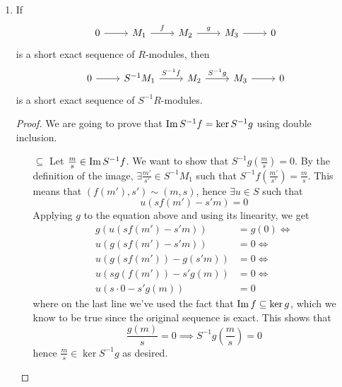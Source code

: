 \begin{exercise}
\begin{enumerate}
\begin{proof}
    For an arbitrary \(I \leq R\), we want \(S^{-1} \sqrt{I} = \sqrt{S^{-1} I}\).
    \begin{itemize}
        \item[\(\subseteq\)] Let \(\frac{a}{s} \in S^{-1} \sqrt{I}\). This means that \(a \in \sqrt{I}\), therefore \(\exists n \in \naturals\) such that \(a^n \in I\). Then \(\frac{a^n}{1} \in S^{-1} I \subseteq \sqrt{S^{-1} I}\).
    
        \item[\(\supseteq\)] Let \(\frac{a}{s} \in \sqrt{S^{-1} I}\). This means that \(\exists n \in \naturals\) such that \(\left(\frac{a}{s}\right)^n \in S^{-1} I\). Hence \(\frac{a^n}{s^n} \in S^{-1} I\), from which we deduce that \(a^n \in I\). Therefore \(a \in \sqrt{I}\).
    \end{itemize}
    \end{proof}
    
    \item If
    \[
        \begin{tikzcd}
            0 \arrow[r] & M_1 \arrow[r, "f"] & M_2 \arrow[r, "g"] & M_3 \arrow[r] & 0
        \end{tikzcd}
    \]
    is a short exact sequence of \(R\)-modules, then
    \[
        \begin{tikzcd}
            0 \arrow[r] & S^{-1} M_1 \arrow[r, "S^{-1} f"] & M_2 \arrow[r, "S^{-1} g"] & M_3 \arrow[r] & 0
        \end{tikzcd}
    \]
    is a short exact sequence of \(S^{-1} R\)-modules.
    
    \begin{proof}
    We are going to prove that \(\operatorname{Im} S^{-1} f = \ker S^{-1} g\) using double inclusion.
    
    \begin{itemize}
        \item[\(\subseteq\)] Let \(\frac{m}{s} \in \operatorname{Im} S^{-1} f\). We want to show that \(S^{-1} g\left(\frac{m}{s}\right) = 0\). By the definition of the image, \(\exists \frac{m'}{s'} \in S^{-1} M_1\) such that \(S^{-1} f \left(\frac{m'}{s'}\right) = \frac{m}{s}\). This means that \((f(m'), s') \sim (m, s)\), hence \(\exists u \in S\) such that
        \[
            u(s f(m') - s' m) = 0
        \]
        Applying \(g\) to the equation above and using its linearity, we get
        \begin{align*}
            g(u(s f(m') - s' m)) &= g(0) \iff \\
            u(g(s f(m') - s' m)) &= 0 \iff \\
            u(g(s f(m')) - g(s' m)) &= 0 \iff \\
            u(s g (f(m')) - s' g (m)) &= 0 \iff \\
            u(s \cdot 0 - s' g (m)) &= 0
        \end{align*}
        where on the last line we've used the fact that \(\operatorname{Im} f \subseteq \ker g\), which we know to be true since the original sequence is exact. This shows that
        \[
            \frac{g(m)}{s} = 0 \implies S^{-1} g \left(\frac{m}{s}\right) = 0
        \]
        hence \(\frac{m}{s} \in \ker S^{-1} g\) as desired.
        

\end{itemize}
\end{proof}
\end{enumerate}
\end{exercise}
